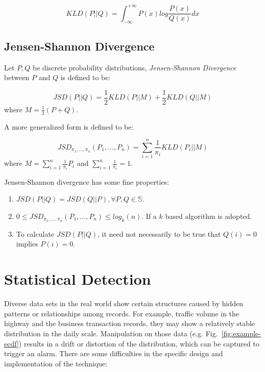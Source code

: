 \documentclass[10pt,conference,letterpaper]{IEEEtran}
\begin{document}
			\begin{equation}
				KLD(P||Q) = \int_{-\infty}^{+\infty} P(x)log\frac{P(x)}{Q(x)}dx
			\end{equation}
	
		\subsection{Jensen-Shannon Divergence}
			Let $P,Q$ be discrete probability distributions, \textit{Jensen-Shannon Divergence} between $P$ and $Q$ is defined to be:
	
			\begin{equation}
				JSD(P||Q) = \frac{1}{2}KLD(P||M) + \frac{1}{2}KLD(Q||M)
			\end{equation}
			where $\displaystyle M = \frac{1}{2}(P+Q)$.
	
			A more generalized form is defined to be:
			
			\begin{equation}
				JSD_{\pi_1, \dots, \pi_n}(P_1, \dots, P_n) = \sum_{i=1}^{n}\frac{1}{\pi_i}KLD(P_i||M)
			\end{equation}
			where $\displaystyle M = \sum_{i=1}^{n}\frac{1}{\pi_i}P_i$ and $\displaystyle \sum_{i=1}^{n}\frac{1}{\pi_i} = 1$.
	
			Jensen-Shannon divergence has some fine properties:
			\begin{enumerate}
				\item $JSD(P||Q) = JSD(Q||P), \forall P, Q\in \mathbb{S}$.
				\item $0 \le JSD_{\pi_1, \dots, \pi_n}(P_1, \dots, P_n) \le log_k(n)$. If a $k$ based algorithm is adopted.
				\item To calculate $JSD(P||Q)$, it need not necessarily to be true that $Q(i)=0$ implies $P(i)=0$.
			\end{enumerate}
	
	\section{Statistical Detection}\label{sec:algorithm-details}
		Diverse data sets in the real world show certain structures caused by hidden patterns or relationships among records. For example, traffic volume in the highway and the business transaction records, they may show a relatively stable distribution in the daily scale. Manipulation on those data (e.g. Fig.~\ref{fig:example-ecdf}) results in a drift or distortion of the distribution, which can be captured to trigger an alarm. There are some difficulties in the specific design and implementation of the technique:
	
\end{document}
